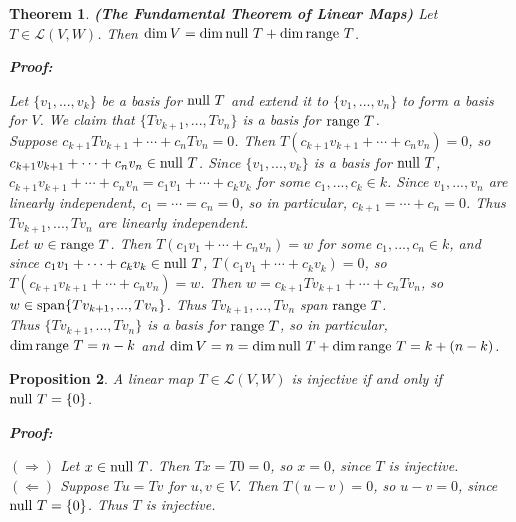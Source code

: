\documentclass{article}
\theoremstyle{colontheorem}
\newtheorem{theorem}{Theorem}[section]
\newtheorem{proposition}[theorem]{Proposition}
\newcommand{\Span}{\textnormal{span}}
\newcommand{\Null}{\textnormal{null }}
\newcommand{\Range}{\textnormal{range }}
\newenvironment{Theorem}
{
	\begin{mdframed}[backgroundcolor=TheoremOrange!10]
	\begin{theorem}
}
{
	\end{theorem}
	\end{mdframed}
	
	\vspace{.15in}
}
\newenvironment{Proposition}
{
	\begin{mdframed}[backgroundcolor=PropPink!10]
	\begin{proposition}
}
{
	\end{proposition}
	\end{mdframed}
	
	\vspace{.15in}
}
\newenvironment{Proof}
{
	\begin{mdframed}[backgroundcolor=ProofPurple!10]
	\textbf{Proof:}%
}
{
	\end{mdframed}
	
	\vspace{.085in}
}
\begin{document}
\begin{Theorem}
	
	\textbf{(The Fundamental Theorem of Linear Maps)} Let $T \in \mathcal{L}(V,W)$. Then $\dim V = \dim \Null T + \dim \Range T$.
	
	\begin{Proof}
		Let $\{v_1, ..., v_k\}$ be a basis for $\Null T$ and extend it to $\{v_1, ..., v_n\}$ to form a basis for $V$. We claim that $\{Tv_{k+1}, ..., Tv_n\}$ is a basis for $\Range T$.\\
		
		Suppose $c_{k+1} Tv_{k+1} + \cdots + c_n Tv_n = 0$. Then $T(c_{k+1} v_{k+1} + \cdots + c_n v_n) = 0$, so $c_{k+1} v_{k+1} + \cdots + c_n v_n \in \Null T$. Since $\{v_1, ..., v_k\}$ is a basis for $\Null T$, $c_{k+1} v_{k+1} + \cdots + c_n v_n = c_1 v_1 + \cdots + c_k v_k$ for some $c_1, ..., c_k \in k$. Since $v_1, ..., v_n$ are linearly independent, $c_1 = \cdots = c_n = 0$, so in particular, $c_{k+1} = \cdots + c_n = 0$. Thus $Tv_{k+1}, ..., Tv_n$ are linearly independent.\\
		
		Let $w \in \Range T$. Then $T(c_1 v_1 + \cdots + c_n v_n) = w$ for some $c_1, ..., c_n \in k$, and since $c_1 v_1 + \cdots + c_k v_k \in \Null T$, $T(c_1 v_1 + \cdots + c_k v_k) = 0$, so $T(c_{k+1} v_{k+1} + \cdots + c_n v_n) = w$. Then $w = c_{k+1} Tv_{k+1} + \cdots + c_n Tv_n$, so $w \in \Span \{Tv_{k+1}, ..., Tv_n\}$. Thus $Tv_{k+1}, ..., Tv_n$ span $\Range T$.\\
		
		Thus $\{Tv_{k+1}, ..., Tv_n\}$ is a basis for $\Range T$, so in particular, $\dim \Range T = n - k$ and $\dim V = n = \dim \Null T + \dim \Range T = k + (n-k)$.
		
	\end{Proof}
	
\end{Theorem}



\begin{Proposition}
	
	A linear map $T \in \mathcal{L}(V,W)$ is injective if and only if $\Null T = \{0\}$.
	
	\begin{Proof}
		$(\Rightarrow)$ Let $x \in \Null T$. Then $Tx = T0 = 0$, so $x = 0$, since $T$ is injective.\\
		
		$(\Leftarrow)$ Suppose $Tu = Tv$ for $u, v \in V$. Then $T(u-v) = 0$, so $u - v = 0$, since $\Null T = \{0\}$. Thus $T$ is injective.
		
	\end{Proof}
	
\end{Proposition}
\end{document}
